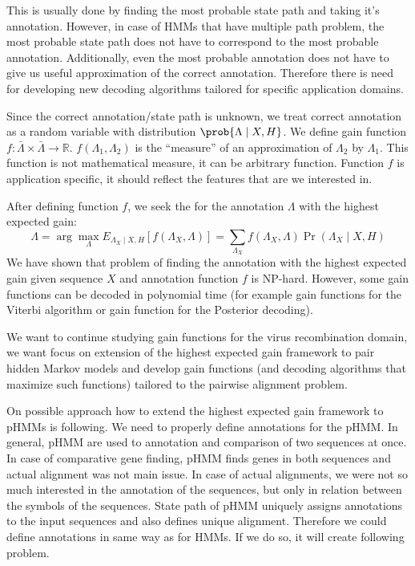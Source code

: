 This is usually done by finding the most probable state path and taking it's
annotation. However, in case of HMMs that have multiple path problem, 
the most probable state path does not have to correspond to the most probable
annotation. Additionally, even the most probable annotation does not have to
give us useful approximation of the correct annotation. Therefore there is need
for developing new decoding algorithms tailored for specific application
domains.


Since the correct annotation/state path is unknown, we treat correct annotation
as a random variable with distribution $\prob{\Lambda\mid X,H}$. We define gain
function $f:\bar{\Lambda}\times\bar{\Lambda}\to \mathbb{R}$.
$f(\Lambda_1,\Lambda_2)$ is the ``measure'' of an approximation of $\Lambda_2$
by $\Lambda_1$. This function is not mathematical measure, it can be arbitrary
function. Function $f$ is application specific, it should reflect the features
that are we interested in.

After defining function $f$, we seek the for the annotation $\Lambda$ with the highest expected gain:
\[\Lambda = \arg\max_{\Lambda} 
E_{\Lambda_X\mid X,H}[f(\Lambda_X,\Lambda)] =
\sum_{\Lambda_X}f(\Lambda_X,\Lambda)\Pr\left(\Lambda_X\mid X,H\right)
\]
We have shown that problem of finding the annotation with the highest expected
gain given sequence $X$ and annotation function $f$ is NP-hard. However, some gain
functions can be decoded in polynomial time (for example gain functions for the
Viterbi algorithm or gain function for  the Posterior decoding).

We want to continue studying gain functions for the virus recombination
domain, we want focus on extension of the highest expected gain framework to
pair hidden Markov models and develop gain functions (and decoding algorithms
that maximize such functions) tailored to the pairwise alignment problem. 

On possible approach how to extend the highest expected gain framework to pHMMs
is following.  We need to properly define annotations for the pHMM. In general,
pHMM are used to annotation and comparison of two sequences at once. In case of
comparative gene finding, pHMM finds genes in both sequences and actual
alignment was not main issue. In case of actual alignments, we were not so much
interested in the annotation of the sequences, but only in relation between the
symbols of the sequences. State path of pHMM uniquely assigns annotations to the
input sequences and also defines unique alignment.  Therefore we could define
annotations in same way as for HMMs. If we do so, it will create following
problem.

